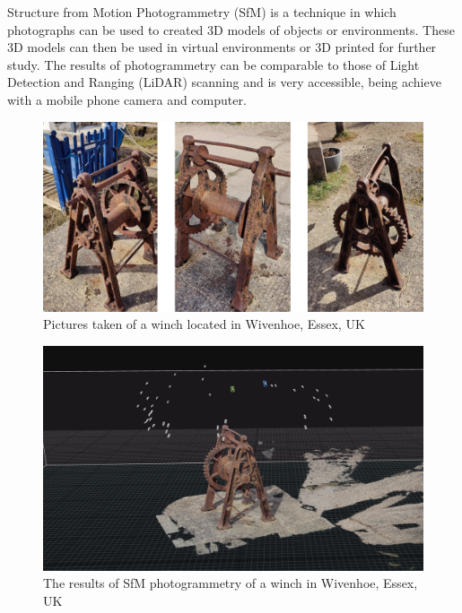 \documentclass[12pt]{article}
\begin{document}
Structure from Motion Photogrammetry (SfM) is a technique in which photographs can be used to created 3D models of objects or environments. These 3D models can then be used in virtual environments or 3D printed for further study. The results of photogrammetry can be comparable to those of Light Detection and Ranging (LiDAR) scanning and is very accessible, being achieve with a mobile phone camera and computer. \cite{iglhaut2019structure}

\begin{figure}[h]
  \centering
  \begin{minipage}[b]{0.7\linewidth}
    \includegraphics[width=\linewidth]{images/winch photogrammetry.png}
    \caption{Pictures taken of a winch located in Wivenhoe, Essex, UK}
    \label{fig:winchPhotogrammetry}
  \end{minipage}
\end{figure}

\begin{figure}[h]
  \centering
  \begin{minipage}[b]{0.7\linewidth}
    \includegraphics[width=\linewidth]{images/winch photogrammetry project.png}
    \caption{The results of SfM photogrammetry of a winch in Wivenhoe, Essex, UK}
    \label{fig:winchPhotogrammetryProject}
  \end{minipage}
\end{figure}
\end{document}
